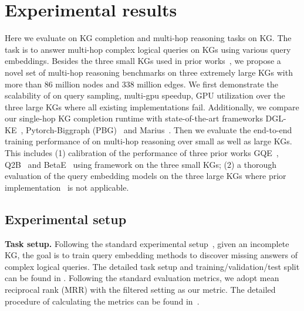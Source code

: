 \section{Experimental results}\label{sec:exp}


Here we evaluate \modelshort on KG completion and multi-hop reasoning tasks on KG. The task is to answer multi-hop complex logical queries on KGs using various query embeddings. Besides the three small KGs used in prior works~\cite{ren2020query2box,ren2020beta}, we propose a novel set of multi-hop reasoning benchmarks on three extremely large KGs with more than 86 million nodes and 338 million edges. We first demonstrate the scalability of \modelshort on query sampling, multi-gpu speedup, GPU utilization over the three large KGs where all existing implementations fail. Additionally, we compare our single-hop KG completion runtime with state-of-the-art frameworks DGL-KE~\cite{zheng2020dgl}, Pytorch-Biggraph (PBG)~\cite{lerer2019pytorch} and Marius~\cite{mohoney2021marius}. Then we evaluate the end-to-end training performance of \modelshort on multi-hop reasoning over small as well as large KGs. This includes (1) calibration of the performance of three prior works GQE~\cite{hamilton2018embedding}, Q2B~\cite{ren2020query2box} and BetaE~\cite{ren2020beta} using \modelshort framework on the three small KGs; (2) a thorough evaluation of the query embedding models on the three large KGs where prior implementation~\cite{kgreasoning} is not applicable. 



\subsection{Experimental setup}

\textbf{Task setup.} Following the standard experimental setup~\citep{ren2020query2box}, given an incomplete KG, the goal is to train query embedding methods to discover missing answers of complex logical queries. The detailed task setup and training/validation/test split can be found in .
Following the standard evaluation metrics, we adopt mean reciprocal rank (MRR) with the filtered setting as our metric. 
The detailed procedure of calculating the metrics can be found in~.


